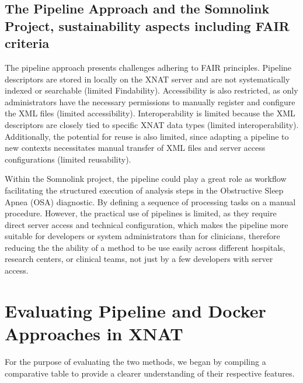 


\subsection{The Pipeline Approach and the Somnolink Project, sustainability aspects including FAIR criteria}
The pipeline approach presents challenges adhering to FAIR principles.
Pipeline descriptors are stored in locally on the XNAT server and are not systematically indexed or searchable (limited Findability).
 Accessibility is also restricted, as only administrators have the necessary permissions to manually register and configure the XML files (limited accessibility).
 Interoperability is limited because the XML descriptors are closely tied to specific XNAT data types (limited interoperability). Additionally, the potential for reuse is also limited, since adapting a pipeline to new contexts necessitates manual transfer of XML files and server access configurations (limited reusability).
 
Within the Somnolink project, the pipeline could play a great role as workflow  facilitating the structured execution of analysis steps in the Obstructive Sleep Apnea (OSA) diagnostic. By defining a sequence of processing tasks on a manual procedure. However, the practical use of pipelines is limited, as they require direct server access and technical configuration, which makes the pipeline more suitable for developers or system administrators than for clinicians, therefore reducing the the ability of a method to be use easily across different hospitals, research centers, or clinical teams, not just by a few developers with server access.








\section{Evaluating Pipeline and Docker Approaches in XNAT}

For the purpose of evaluating the two methods, we began by compiling a comparative table to provide a clearer understanding of their respective features. 

